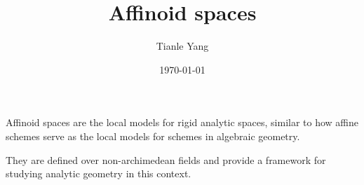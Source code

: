 \documentclass[sectionlevel=chapter]{noteformyself}
\title{Affinoid spaces}
\author{Tianle Yang}
\date{\today}
\begin{document}
    \maketitle

    \tableofcontents

    \begin{slogan}
        Affinoid spaces are the local models for rigid analytic spaces, similar to how affine schemes serve as the local models for schemes in algebraic geometry. 
    \end{slogan}
    They are defined over non-archimedean fields and provide a framework for studying analytic geometry in this context.

    \printbibliography[heading=bibintoc, title={References}]
    
\end{document}
